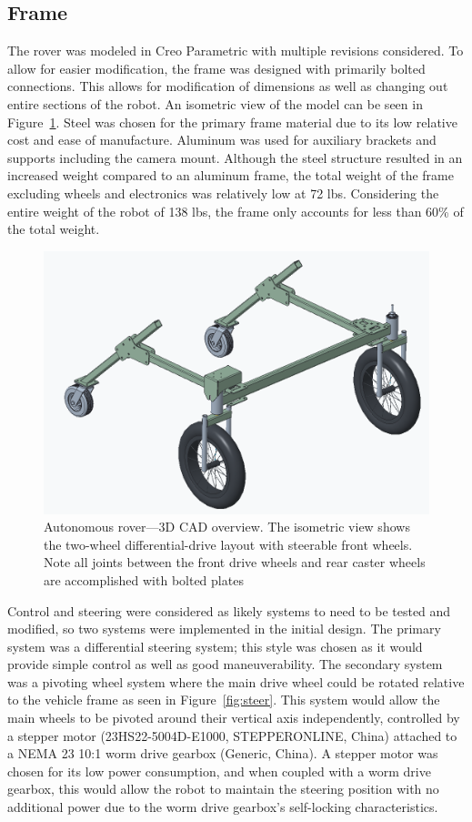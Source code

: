 \subsection{Frame}
The rover was modeled in Creo Parametric \cite{ptc_creo_2023} with multiple revisions considered. To allow for easier modification, the frame was designed with primarily bolted connections. This allows for modification of dimensions as well as changing out entire sections of the robot. An isometric view of the model can be seen in Figure~\ref{fig:Initial CAD Model}. Steel was chosen for the primary frame material due to its low relative cost and ease of manufacture. Aluminum was used for auxiliary brackets and supports including the camera mount. Although the steel structure resulted in an increased weight compared to an aluminum frame, the total weight of the frame excluding wheels and electronics was relatively low at 72 lbs. Considering the entire weight of the robot of 138 lbs, the frame only accounts for less than 60\% of the total weight.


\begin{figure}[!ht]
    \centering
    \includegraphics[width=0.75\linewidth]{images/CAD.png}
    \caption{Autonomous rover—3D CAD overview. The isometric view shows the two-wheel differential-drive layout with steerable front wheels. Note all joints between the front drive wheels and rear caster wheels are accomplished with bolted plates}

    \label{fig:Initial CAD Model}
\end{figure}

Control and steering were considered as likely systems to need to be tested and modified, so two systems were implemented in the initial design. The primary system was a differential steering system; this style  was chosen as it would provide simple control as well as good maneuverability. The secondary system was a pivoting wheel system where the main drive wheel could be rotated relative to the vehicle frame as seen in Figure~\ref{fig:steer}. This system would allow the main wheels to be pivoted around their vertical axis independently, controlled by a stepper motor (23HS22-5004D-E1000, STEPPERONLINE, China) attached to a NEMA 23 10:1 worm drive gearbox (Generic, China). A stepper motor was chosen for its low power consumption, and when coupled with a worm drive gearbox, this would allow the robot to maintain the steering position with no additional power due to the worm drive gearbox's self-locking characteristics.

